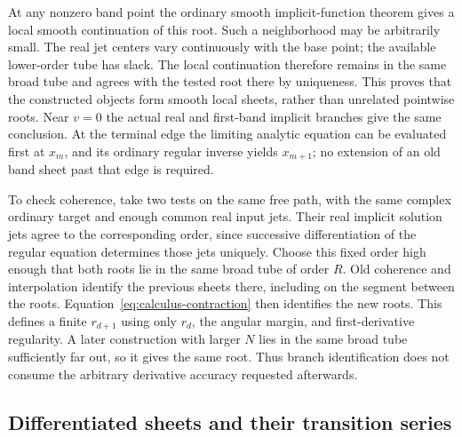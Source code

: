 At any nonzero band point the ordinary smooth implicit-function theorem
gives a local smooth continuation of this root.  Such a neighborhood may
be arbitrarily small.  The real jet centers vary continuously with the
base point; the available lower-order tube has slack.  The local
continuation therefore remains in the same broad tube and agrees with
the tested root there by uniqueness.  This proves that the constructed
objects form smooth local sheets, rather than unrelated pointwise roots.
Near $v=0$ the actual real and first-band implicit branches give the same
conclusion.  At the terminal edge the limiting analytic equation can be
evaluated first at $x_m$, and its ordinary regular inverse yields
$x_{m+1}$; no extension of an old band sheet past that edge is required.

To check coherence, take two tests on the same free path, with the same
complex ordinary target and enough common real input jets.
Their real implicit solution jets agree to the corresponding order,
since successive differentiation of the regular equation determines
those jets uniquely.  Choose this fixed order high enough that both
roots lie in the same broad tube of order $R$.  Old coherence and
interpolation identify the previous sheets there, including on the
segment between the roots.  Equation~\eqref{eq:calculus-contraction}
then identifies the new roots.  This defines a finite $r_{d+1}$ using
only $r_d$, the angular margin, and first-derivative regularity.  A later
construction with larger $N$ lies in the same broad tube sufficiently
far out, so it gives the same root.  Thus branch identification does not
consume the arbitrary derivative accuracy requested afterwards.

\subsection{Differentiated sheets and their transition series}

